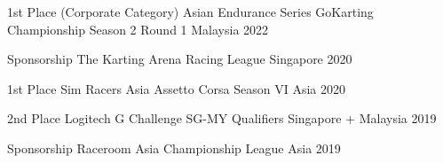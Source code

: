 



\begin{cvhonors}

  \cvhonor
    {1st Place (Corporate Category)} %
    {Asian Endurance Series GoKarting Championship Season 2 Round 1} %
    {Malaysia} %
    {2022} %
  
  \cvhonor
    {Sponsorship} %
    {The Karting Arena Racing League} %
    {Singapore} %
    {2020} %
  
  \cvhonor
    {1st Place} %
    {Sim Racers Asia Assetto Corsa Season VI} %
    {Asia} %
    {2020} %

  \cvhonor
    {2nd Place} %
    {Logitech G Challenge SG-MY Qualifiers} %
    {Singapore + Malaysia} %
    {2019} %
  
  \cvhonor
    {Sponsorship} %
    {Raceroom Asia Championship League} %
    {Asia} %
    {2019} %

\end{cvhonors}
